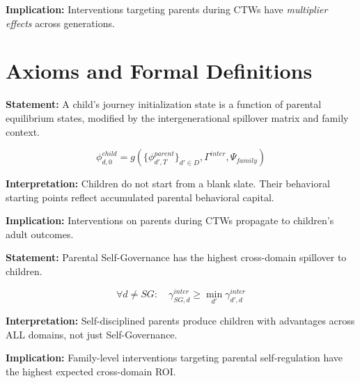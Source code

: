 \textbf{Implication:} Interventions targeting parents during CTWs have \textit{multiplier effects}
across generations.


\section{Axioms and Formal Definitions}
\label{sec:BI-axioms}

\begin{tcolorbox}[colback=gray!5!white, colframe=gray!75!black,
    title=Axiom UNMAPPED_COR-1: Behavioral Inheritance]
\textbf{Statement:} A child's journey initialization state is a function of parental equilibrium states,
modified by the intergenerational spillover matrix and family context.

\begin{equation}
\phi^{child}_{d,0} = g\left(\{\phi^{parent}_{d',T}\}_{d' \in D}, \Gamma^{inter}, \Psi_{family}\right)
\end{equation}

\textbf{Interpretation:} Children do not start from a blank slate. Their behavioral starting points
reflect accumulated parental behavioral capital.

\textbf{Implication:} Interventions on parents during CTWs propagate to children's adult outcomes.
\end{tcolorbox}

\begin{tcolorbox}[colback=gray!5!white, colframe=gray!75!black,
    title=Axiom UNMAPPED_COR-2: Self-Governance Primacy]
\textbf{Statement:} Parental Self-Governance has the highest cross-domain spillover to children.

\begin{equation}
\forall d \neq SG: \quad \gamma^{inter}_{SG,d} \geq \min_{d'} \gamma^{inter}_{d',d}
\end{equation}

\textbf{Interpretation:} Self-disciplined parents produce children with advantages across ALL domains,
not just Self-Governance.

\textbf{Implication:} Family-level interventions targeting parental self-regulation have the highest
expected cross-domain ROI.
\end{tcolorbox}

